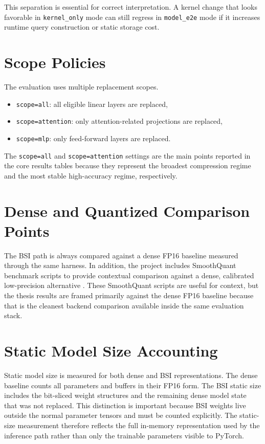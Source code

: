 This separation is essential for correct interpretation. A kernel change that looks favorable in \texttt{kernel\_only} mode can still regress in \texttt{model\_e2e} mode if it increases runtime query construction or static storage cost.

\section{Scope Policies}
The evaluation uses multiple replacement scopes.

\begin{itemize}[leftmargin=2em]
\item \texttt{scope=all}: all eligible linear layers are replaced,
\item \texttt{scope=attention}: only attention-related projections are replaced,
\item \texttt{scope=mlp}: only feed-forward layers are replaced.
\end{itemize}

The \texttt{scope=all} and \texttt{scope=attention} settings are the main points reported in the core results tables because they represent the broadest compression regime and the most stable high-accuracy regime, respectively.

\section{Dense and Quantized Comparison Points}
The BSI path is always compared against a dense FP16 baseline measured through the same harness. In addition, the project includes SmoothQuant benchmark scripts to provide contextual comparison against a dense, calibrated low-precision alternative \cite{smoothquant}. These SmoothQuant scripts are useful for context, but the thesis results are framed primarily against the dense FP16 baseline because that is the cleanest backend comparison available inside the same evaluation stack.

\section{Static Model Size Accounting}
Static model size is measured for both dense and BSI representations. The dense baseline counts all parameters and buffers in their FP16 form. The BSI static size includes the bit-sliced weight structures and the remaining dense model state that was not replaced. This distinction is important because BSI weights live outside the normal parameter tensors and must be counted explicitly. The static-size measurement therefore reflects the full in-memory representation used by the inference path rather than only the trainable parameters visible to PyTorch.

